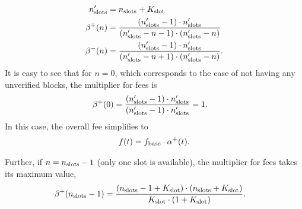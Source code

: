 \begin{align}
n'_\textnormal{slots} &= n_\textnormal{slots} + K_\textnormal{slot} \\
\beta^+(n) &= \frac{(n'_\textnormal{slots}- 1) \cdot n'_\textnormal{slots}}{(n'_\textnormal{slots}-n-1)\cdot (n'_\textnormal{slots}-n)}\\
\beta^-(n) &= \frac{(n'_\textnormal{slots}- 1 ) \cdot n'_\textnormal{slots}}{(n'_\textnormal{slots}-n + 1)\cdot (n'_\textnormal{slots}-n)}.
\end{align}
It is easy to see that for $n=0$, which corresponds to the case of not having any unverified blocks, the multiplier for fees is
\begin{align}
\beta^+(0) &= \frac{(n'_\textnormal{slots}- 1 ) \cdot n'_\textnormal{slots}
}{(n'_\textnormal{slots}-1)\cdot n'_\textnormal{slots}}=1.
\end{align}
In this case, the overall fee simplifies to
\begin{align}
f(t) = f_\textnormal{base} \cdot \alpha^+(t).
\end{align}

Further, if $n = n_\textnormal{slots}-1$ (only one slot is available),  the multiplier for fees takes its maximum value,
\begin{align}
\beta^+(n_\textnormal{slots}-1)
&=
\frac{(n_\textnormal{slots}- 1 + K_\textnormal{slot} ) \cdot (n_\textnormal{slots} + K_\textnormal{slot})}{K_\textnormal{slot}\cdot (1 + K_\textnormal{slot})}.
\end{align}

